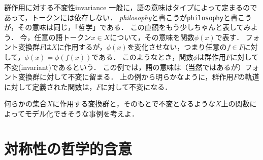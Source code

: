 \documentclass[11pt,a4paper, dvipdfmx]{jsarticle}
\begin{document}
\begin{rei}{群作用に対する不変性}{invariance}
一般に，語の意味はタイプによって定まるのであって，トークンには依存しない．
\textit{philosophy}と書こうが\texttt{philosophy}と書こうが，その意味は同じ，「哲学」である．
この直観をもう少しちゃんと表してみよう．
今，任意の語トークン$x \in X$について，その意味を関数$\phi(x)$で表す．
フォント変換群$F$は$X$に作用するが，$\phi(x)$を変化させない，つまり任意の$f \in F$に対して，$\phi(x) = \phi(f(x))$である．
このようなとき，関数$\phi$は群作用$F$に対して不変(invariant)であるという．
この例では，語の意味は（当然ではあるが）フォント変換群に対して不変に留まる．
上の例から明らかなように，群作用$F$の軌道に対して定義された関数は，$F$に対して不変になる．

\end{rei}


\begin{renshu}{}{}
 何らかの集合$X$に作用する変換群と，そのもとで不変となるような$X$上の関数によってモデル化できそうな事例を考えよ．
\end{renshu}


\section{対称性の哲学的含意}
\end{document}
